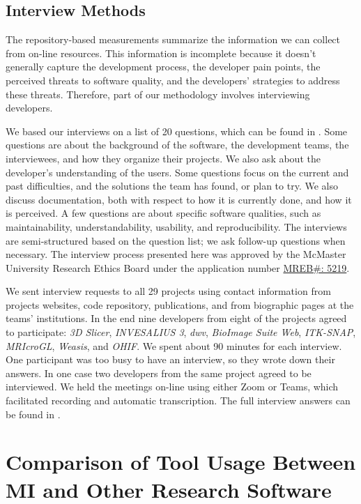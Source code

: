 \documentclass[final, 12pt, 3p, times]{elsarticle}
\begin{document}
\subsection{Interview Methods} \label{sec_interview_methods}

The repository-based measurements summarize the information we can collect from
on-line resources. This information is incomplete because it doesn't generally
capture the development process, the developer pain points, the perceived
threats to software quality, and the developers' strategies to address these
threats.  Therefore, part of our methodology involves interviewing developers.

We based our interviews on a list of 20 questions, which can be found in
\cite{SmithEtAl2021}. Some questions are about the background of the software,
the development teams, the interviewees, and how they organize their projects.
We also ask about the developer's understanding of the users. Some questions
focus on the current and past difficulties, and the solutions the team has
found, or plan to try. We also discuss documentation, both with respect to how
it is currently done, and how it is perceived. A few questions are about
specific software qualities, such as maintainability, understandability,
usability, and reproducibility. The interviews are semi-structured based on the
question list; we ask follow-up questions when necessary.  The interview process
presented here was approved by the McMaster University Research Ethics Board
under the application number
\href{https://github.com/smiths/AIMSS/blob/master/StateOfPractice/MACREM/Application.pdf}
{MREB\#: 5219}.

We sent interview requests to all 29 projects using contact information from
projects websites, code repository, publications, and from biographic pages at
the teams' institutions.  In the end nine developers from eight of the projects
agreed to participate: \textit{3D Slicer}, \textit{INVESALIUS 3}, \textit{dwv},
\textit{BioImage Suite Web}, \textit{ITK-SNAP}, \textit{MRIcroGL},
\textit{Weasis}, and \textit{OHIF}. We spent about 90 minutes for each
interview. One participant was too busy to have an interview, so they wrote down
their answers. In one case two developers from the same project agreed to be
interviewed. We held the meetings on-line using either Zoom or Teams, which
facilitated recording and automatic transcription. The full interview answers
can be found in \cite{Dong2021}.

\section{Comparison of Tool Usage Between MI and Other Research Software}
\label{Sec_CompareTools}
\end{document}
